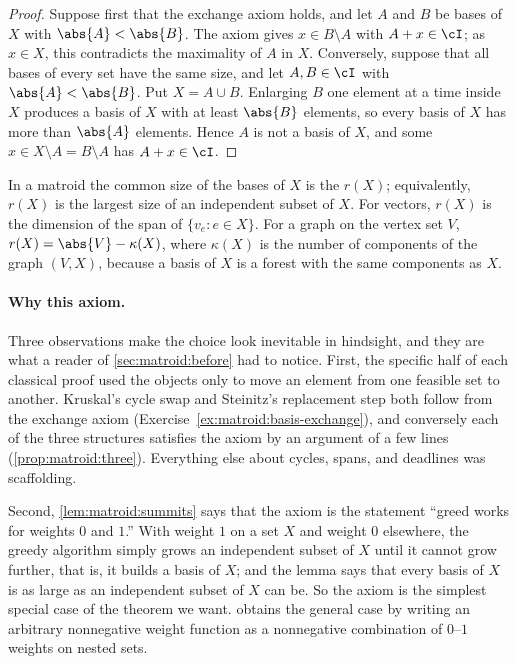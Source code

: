\begin{refsection}

\begin{proof}
Suppose first that the exchange axiom holds, and let $A$ and $B$ be bases of $X$ with $\abs{A}<\abs{B}$. The axiom gives $x\in B\setminus A$ with $A+x\in\cI$; as $x\in X$, this contradicts the maximality of $A$ in $X$. Conversely, suppose that all bases of every set have the same size, and let $A,B\in\cI$ with $\abs{A}<\abs{B}$. Put $X=A\cup B$. Enlarging $B$ one element at a time inside $X$ produces a basis of $X$ with at least $\abs{B}$ elements, so every basis of $X$ has more than $\abs{A}$ elements. Hence $A$ is not a basis of $X$, and some $x\in X\setminus A=B\setminus A$ has $A+x\in\cI$.
\end{proof}

In a matroid the common size of the bases of $X$ is the  $r(X)$; equivalently, $r(X)$ is the largest size of an independent subset of $X$. For vectors, $r(X)$ is the dimension of the span of $\{v_e : e\in X\}$. For a graph on the vertex set $V$, $r(X)=\abs{V}-\kappa(X)$, where $\kappa(X)$ is the number of components of the graph $(V,X)$, because a basis of $X$ is a forest with the same components as $X$.

\paragraph{Why this axiom.} Three observations make the choice look inevitable in hindsight, and they are what a reader of \cref{sec:matroid:before} had to notice. First, the specific half of each classical proof used the objects only to move an element from one feasible set to another. Kruskal's cycle swap and Steinitz's replacement step both follow from the exchange axiom (Exercise~\ref{ex:matroid:basis-exchange}), and conversely each of the three structures satisfies the axiom by an argument of a few lines (\cref{prop:matroid:three}). Everything else about cycles, spans, and deadlines was scaffolding.

Second, \cref{lem:matroid:summits} says that the axiom is the statement ``greed works for weights $0$ and $1$.'' With weight $1$ on a set $X$ and weight $0$ elsewhere, the greedy algorithm simply grows an independent subset of $X$ until it cannot grow further, that is, it builds a basis of $X$; and the lemma says that every basis of $X$ is as large as an independent subset of $X$ can be. So the axiom is the simplest special case of the theorem we want.  obtains the general case by writing an arbitrary nonnegative weight function as a nonnegative combination of $0$--$1$ weights on nested sets.


\end{refsection}
